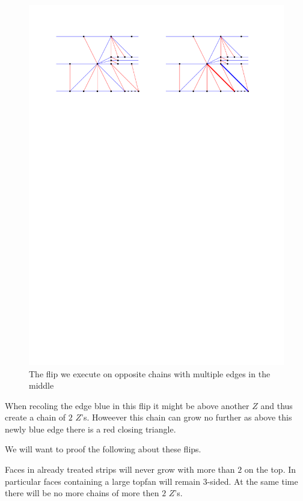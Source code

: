\begin{figure}[h]
  \centering
  \includegraphics[width = \textwidth]{unifiedAlgo/img/post/oppMultiFlip}
  \caption{The flip we execute on opposite chains with multiple edges in the middle}
  \label{fig:uni:oppMultiFlip}
\end{figure}

When recoling the edge blue in this flip it might be above another $Z$ and thus create a chain of $2$ $Z$'s. Howeever this chain can grow no further as above this newly blue edge there is a red closing triangle.



We will want to proof the following about these flips.

\begin{lemma}
  \label{lm:}
  Faces in already treated strips will never grow with more than $2$ on the top. In particular faces containing a large topfan will remain 3-sided. At the same time there will be no more chains of more then $2$ $Z$'s.
\end{lemma}

